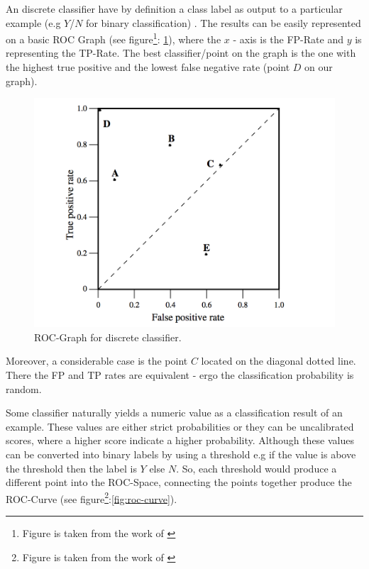 An discrete classifier have by definition a class label as output to a particular example (e.g \(Y\)/\(N\) for binary classification) \cite{Fawcett:2006:IRA:1159473.1159475}. The results can be easily represented on a basic ROC Graph (see figure\footnote{Figure is taken from the work of \cite{Fawcett:2006:IRA:1159473.1159475}}: \ref{fig:roc-graph}), where the \(x\) - axis is the FP-Rate and \(y\) is representing the TP-Rate. The best classifier/point on the graph is the one with the highest true positive and the lowest false negative rate (point \(D\) on our graph).
\begin{figure}[h!]
    \centering
    \includegraphics[scale=0.6]{Graphics/roc-graph.png}
    \caption{ROC-Graph for discrete classifier.}
    \label{fig:roc-graph}
\end{figure}

Moreover, a considerable case is the point \(C\) located on the diagonal dotted line. There the FP and TP rates are equivalent - ergo the classification probability is random.

Some classifier naturally yields a numeric value as a classification result of an example. These values are either strict probabilities or they can be uncalibrated scores, where a higher score indicate a higher probability. Although these values can be converted into binary labels by using a threshold e.g if the value is above the threshold then the label is \(Y\) else \(N\). So, each threshold would produce a different point into the ROC-Space, connecting the points together produce the ROC-Curve (see figure\footnote{Figure is taken from the work of \cite{Fawcett:2006:IRA:1159473.1159475}}:\ref{fig:roc-curve}). 

